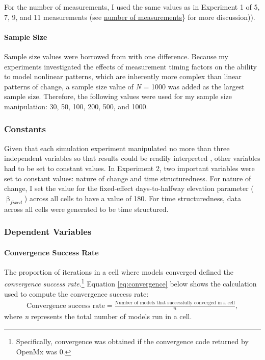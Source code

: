 \documentclass[
12pt, %
twoside,
english]{guelphthesis}
\begin{document}
For the number of measurements, I used the same values as in Experiment 1 of 5, 7, 9, and 11 measurements (see \protect\hyperlink{number-measurements}{number of measurements}\} for more discussion)).

\hypertarget{sample-size}{%
\paragraph{Sample Size}\label{sample-size}}

Sample size values were borrowed from \textcite{coulombe2016} with one difference.
Because my experiments investigated the effects of measurement timing
factors on the ability to model nonlinear patterns, which are inherently
more complex than linear patterns of change, a sample size value of \emph{N}
= 1000 was added as the largest sample size. Therefore, the following
values were used for my sample size manipulation: 30, 50, 100, 200, 500,
and 1000.

\hypertarget{constants-exp2}{%
\subsubsection{Constants}\label{constants-exp2}}

Given that each simulation experiment manipulated no more than three independent variables so that results could be readily interpreted \autocite{halford2005}, other variables had to be set to constant values. In Experiment 2, two important variables were set to constant values: nature of change and time structuredness. For nature of change, I set the value for the fixed-effect days-to-halfway elevation parameter (\(\upbeta_{fixed}\)) across all cells to have a value of 180. For time structuredness, data across all cells were generated to be time structured.

\hypertarget{dependent-variables-1}{%
\subsubsection{Dependent Variables}\label{dependent-variables-1}}

\hypertarget{convergence-success-rate}{%
\paragraph{Convergence Success Rate}\label{convergence-success-rate}}

The proportion of iterations in a cell where models converged defined
the \emph{convergence success rate}.\footnote{Specifically, convergence was obtained if the convergence code returned by OpenMx was 0.} Equation \eqref{eq:convergence} below shows the calculation used to compute the convergence success rate:
\begin{align}
  \text{Convergence success rate} =  \frac{\text{Number of models that successfully converged in a cell}}{n},
  \label{eq:convergence} 
\end{align}
\noindent where \emph{n} represents the total number of models run in a cell.
\end{document}
